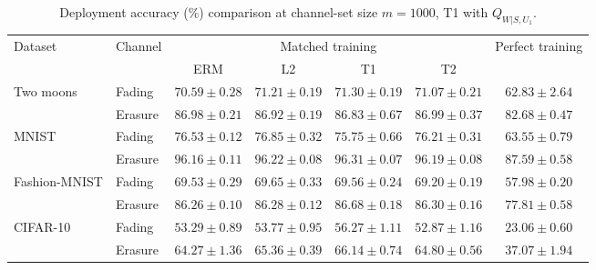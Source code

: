 \begin{table}[htb]
\centering
\caption{Deployment accuracy (\%) comparison at channel-set size $m=1000$, T1 with $Q_{W|S,U_1}$.}
\label{tab:performance}
\begin{tabular*}{\linewidth}{@{\extracolsep{\fill}}llccccc@{}}
\toprule
\multirow{2}{*}{Dataset} & \multirow{2}{*}{Channel}
& \multicolumn{4}{c}{Matched training} & \multirow{2}{*}{Perfect training} \\
\cmidrule(lr){3-6}
& & ERM & L2 & T1 & T2 &  \\
\midrule
\multirow{2}{*}{Two moons}
& Fading
& $70.59\pm0.28$ & $71.21\pm0.19$ & $\mathbf{71.30}\pm0.19$ & $71.07\pm0.21$ & $62.83\pm2.64$ \\
& Erasure
& $86.98\pm0.21$ & $86.92\pm0.19$ & $86.83\pm0.67$ & $\mathbf{86.99}\pm0.37$ & $82.68\pm0.47$ \\
\midrule
\multirow{2}{*}{MNIST}
& Fading
& $76.53\pm0.12$ & $\mathbf{76.85}\pm0.32$ & $75.75\pm0.66$ & $76.21\pm0.31$ & $63.55\pm0.79$ \\
& Erasure
& $96.16\pm0.11$ & $96.22\pm0.08$ & $\mathbf{96.31}\pm0.07$ & $96.19\pm0.08$ & $87.59\pm0.58$ \\
\midrule
\multirow{2}{*}{Fashion-MNIST}
& Fading
& $69.53\pm0.29$ & $\mathbf{69.65}\pm0.33$ & $69.56\pm0.24$ & $69.20\pm0.19$ & $57.98\pm0.20$ \\
& Erasure
& $86.26\pm0.10$ & $86.28\pm0.12$ & $\mathbf{86.68}\pm0.18$ & $86.30\pm0.16$ & $77.81\pm0.58$ \\
\midrule
\multirow{2}{*}{CIFAR-10}
& Fading
& $53.29\pm0.89$ & $53.77\pm0.95$ & $\mathbf{56.27}\pm1.11$ & $52.87\pm1.16$ & $23.06\pm0.60$ \\
& Erasure
& $64.27\pm1.36$ & $65.36\pm0.39$ & $\mathbf{66.14}\pm0.74$ & $64.80\pm0.56$ & $37.07\pm1.94$ \\
\bottomrule
\end{tabular*}
\end{table}
